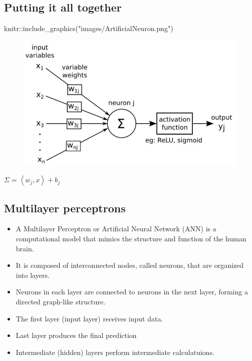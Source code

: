 \documentclass[
  letterpaper,
  DIV=11,
  numbers=noendperiod]{scrartcl}
\newenvironment{Shaded}{\begin{snugshade}}{\end{snugshade}}
\newcommand{\FunctionTok}[1]{\textcolor[rgb]{0.28,0.35,0.67}{#1}}
\newcommand{\NormalTok}[1]{\textcolor[rgb]{0.00,0.23,0.31}{#1}}
\newcommand{\SpecialCharTok}[1]{\textcolor[rgb]{0.37,0.37,0.37}{#1}}
\newcommand{\StringTok}[1]{\textcolor[rgb]{0.13,0.47,0.30}{#1}}
\providecommand{\tightlist}{%
  \setlength{\itemsep}{0pt}\setlength{\parskip}{0pt}}\usepackage{longtable,booktabs,array}
\begin{document}
\hypertarget{putting-it-all-together}{%
\subsection{Putting it all together}\label{putting-it-all-together}}

\begin{Shaded}
\begin{Highlighting}[]
\NormalTok{knitr}\SpecialCharTok{::}\FunctionTok{include\_graphics}\NormalTok{(}\StringTok{"images/ArtificialNeuron.png"}\NormalTok{)}
\end{Highlighting}
\end{Shaded}

\begin{figure}[H]

{\centering \includegraphics[width=1\textwidth,height=\textheight]{images/ArtificialNeuron.png}

}

\end{figure}

\(\Sigma=\left\langle w_{j}, x\right\rangle+ b_{j}\)

\hypertarget{multilayer-perceptrons}{%
\subsection{Multilayer perceptrons}\label{multilayer-perceptrons}}

\begin{itemize}
\tightlist
\item
  A Multilayer Perceptron or Artificial Neural Network (ANN) is a
  computational model that mimics the structure and function of the
  human brain.
\item
  It is composed of interconnected nodes, called neurons, that are
  organized into layers.
\item
  Neurons in each layer are connected to neurons in the next layer,
  forming a directed graph-like structure.
\item
  The first layer (input layer) receives input data.
\item
  Last layer produces the final prediction
\item
  Intermediate (hidden) layers perform intermediate calculatuions.
\end{itemize}
\end{document}
